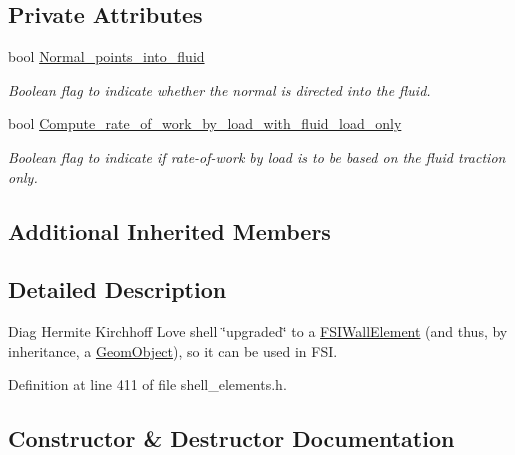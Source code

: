 \subsection*{Private Attributes}
\begin{DoxyCompactItemize}
\item 
bool \hyperlink{classoomph_1_1FSIDiagHermiteShellElement_ab3c496db5b5f7a9321bd9a94559cb72c}{Normal\+\_\+points\+\_\+into\+\_\+fluid}
\begin{DoxyCompactList}\small\item\em Boolean flag to indicate whether the normal is directed into the fluid. \end{DoxyCompactList}\item 
bool \hyperlink{classoomph_1_1FSIDiagHermiteShellElement_a5506fa43f98736bafd5161eb531bcfcc}{Compute\+\_\+rate\+\_\+of\+\_\+work\+\_\+by\+\_\+load\+\_\+with\+\_\+fluid\+\_\+load\+\_\+only}
\begin{DoxyCompactList}\small\item\em Boolean flag to indicate if rate-\/of-\/work by load is to be based on the fluid traction only. \end{DoxyCompactList}\end{DoxyCompactItemize}
\subsection*{Additional Inherited Members}


\subsection{Detailed Description}
Diag Hermite Kirchhoff Love shell \char`\"{}upgraded\char`\"{} to a \hyperlink{classoomph_1_1FSIWallElement}{F\+S\+I\+Wall\+Element} (and thus, by inheritance, a \hyperlink{classoomph_1_1GeomObject}{Geom\+Object}), so it can be used in F\+SI. 

Definition at line 411 of file shell\+\_\+elements.\+h.



\subsection{Constructor \& Destructor Documentation}
\mbox{\label{classoomph_1_1FSIDiagHermiteShellElement_a78392f4bffecd3fc7d03c6b6e9352735}} 
